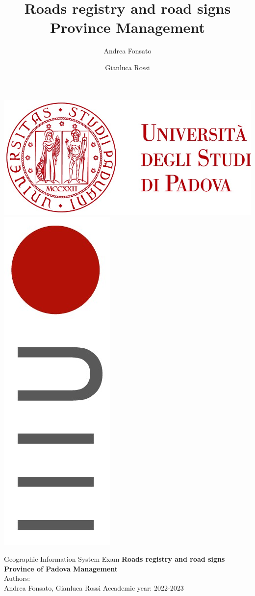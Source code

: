 

\begin{flushleft}
\includegraphics[width=0.3\columnwidth]{images/unipd.jpg}
\hspace{\fill}
\includegraphics[width=0.05\columnwidth]{images/dei.jpg}
\hspace{0.01 cm}
\begin{minipage}[b][1,8 cm][c]{0.3\columnwidth}
\textsf{{\color{Sepia}{DIPARTIMENTO\\DI INGEGNERIA\\DELL’INFORMAZIONE}}}
\end{minipage}
\end{flushleft}

\vfill
\begin{center}

\title{Roads registry and road signs Province Management}
\author{Andrea Fonsato}
\author{Gianluca Rossi}

Geographic Information System Exam
\vfill
\textbf{{\LARGE Roads registry and road signs Province of Padova Management}}
\vspace{5cm} \\
Authors:\\
Andrea Fonsato, Gianluca Rossi
\vfill
Accademic year: 2022-2023
\\
\vfill

\end{center}